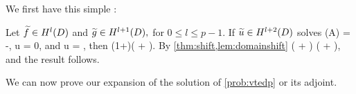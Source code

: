 We first have this simple :

\ble\label{lem:domainshift}
Let $\ftilde \in \HlD$ and $\gtilde \in \HlpoD,$ for $0 \leq l \leq p-1$. If $\utilde \in \HlptD$ solves
\beqs
\grad \cdot \mleft(A\grad \utilde\mright) = -\ftilde,
\eeqs
\beqs \trGD u = 0,
\eeqs
and
\beqs
\dn u = \gtilde,
\eeqs
then
\beqs
\NHlptD{\utilde} \leq \CAl\mleft(1+\CTrlpo\mright)\mleft(\NHlD{\ftilde} + \NHlpoD{\gtilde}\mright).
\eeqs
\ele
{}
By \cref{thm:shift,lem:domainshift}
\beqs
\NHlptD{\utilde} \leq \CAl \mleft(\NHlD{\ftilde} + \NHlphGI{\gtilde}\mright) \leq \CAl \mleft(\NHlD{\ftilde} + \CTrs\NHlpoD{\gtilde}\mright),
\eeqs
and the result follows.
\epf

We can now prove our expansion of the solution of \cref{prob:vtedp} or its adjoint.

